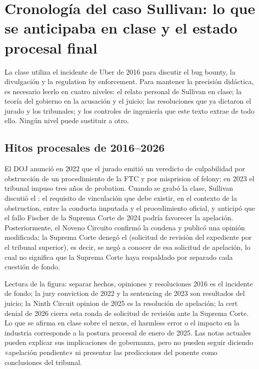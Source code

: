 \section{Cronología del caso Sullivan: lo que se anticipaba en clase y el estado procesal final}

La clase utiliza el incidente de Uber de 2016 para discutir el bug bounty, la divulgación y la regulation by enforcement. Para mantener la precisión didáctica, es necesario leerlo en cuatro niveles: el relato personal de Sullivan en clase; la teoría del gobierno en la acusación y el juicio; las resoluciones que ya dictaron el jurado y los tribunales; y los controles de ingeniería que este texto extrae de todo ello. Ningún nivel puede sustituir a otro.

\subsection{Hitos procesales de 2016--2026}

El DOJ anunció en 2022 que el jurado emitió un veredicto de culpabilidad por obstrucción de un procedimiento de la FTC y por misprision of felony; en 2023 el tribunal impuso tres años de probation. Cuando se grabó la clase, Sullivan discutió el : el requisito de vinculación que debe existir, en el contexto de la obstruction, entre la conducta imputada y el procedimiento oficial, y anticipó que el fallo Fischer de la Suprema Corte de 2024 podría favorecer la apelación. Posteriormente, el Noveno Circuito confirmó la condena y publicó una opinión modificada; la Suprema Corte denegó el  (solicitud de revisión del expediente por el tribunal superior), es decir, se negó a conocer de esa solicitud de apelación, lo cual no significa que la Suprema Corte haya respaldado por separado cada cuestión de fondo.


\begin{knowledgebox}{Lectura de la figura: separar hechos, opiniones y resoluciones}
2016 es el incidente de fondo; la jury conviction de 2022 y la sentencing de 2023 son resultados del juicio; la Ninth Circuit opinion de 2025 es la resolución de apelación; la cert denial de 2026 cierra esta ronda de solicitud de revisión ante la Suprema Corte. Lo que se afirma en clase sobre el nexus, el harmless error o el impacto en la industria corresponde a la postura procesal de enero de 2025. Las notas actuales pueden explicar sus implicaciones de gobernanza, pero no pueden seguir diciendo «apelación pendiente» ni presentar las predicciones del ponente como conclusiones del tribunal.
\end{knowledgebox}

